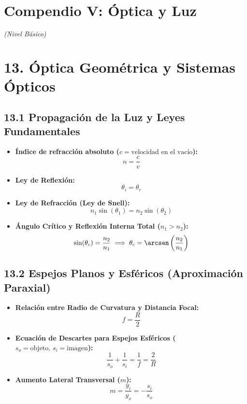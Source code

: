 \documentclass[11pt,a4paper]{article}
\begin{document}
\section*{Compendio V: Óptica y Luz}

\textit{(Nivel Básico)}

\section*{13. Óptica Geométrica y Sistemas Ópticos}

\subsection*{13.1 Propagación de la Luz y Leyes Fundamentales}

\begin{itemize}
  \item \textbf{Índice de refracción absoluto ($c = \text{velocidad en el vacío}$):}
  \[
    n = \frac{c}{v}
  \]
  \item \textbf{Ley de Reflexión:}
  \[
    \theta_i = \theta_r
  \]
  \item \textbf{Ley de Refracción (Ley de Snell):}
  \[
    n_1 \sin(\theta_1) = n_2 \sin(\theta_2)
  \]
  \item \textbf{Ángulo Crítico y Reflexión Interna Total ($n_1 > n_2$):}
  \[
    \sin(\theta_c) = \frac{n_2}{n_1} \implies \theta_c = \arcsen\left( \frac{n_2}{n_1} \right)
  \]
\end{itemize}

\subsection*{13.2 Espejos Planos y Esféricos (Aproximación Paraxial)}

\begin{itemize}
  \item \textbf{Relación entre Radio de Curvatura y Distancia Focal:}
  \[
    f = \frac{R}{2}
  \]
  \item \textbf{Ecuación de Descartes para Espejos Esféricos ($s_o = \text{objeto}, \, s_i = \text{imagen}$):}
  \[
    \frac{1}{s_o} + \frac{1}{s_i} = \frac{1}{f} = \frac{2}{R}
  \]
  \item \textbf{Aumento Lateral Transversal ($m$):}
  \[
    m = \frac{y_i}{y_o} = -\frac{s_i}{s_o}
  \]
\end{itemize}
\end{document}
